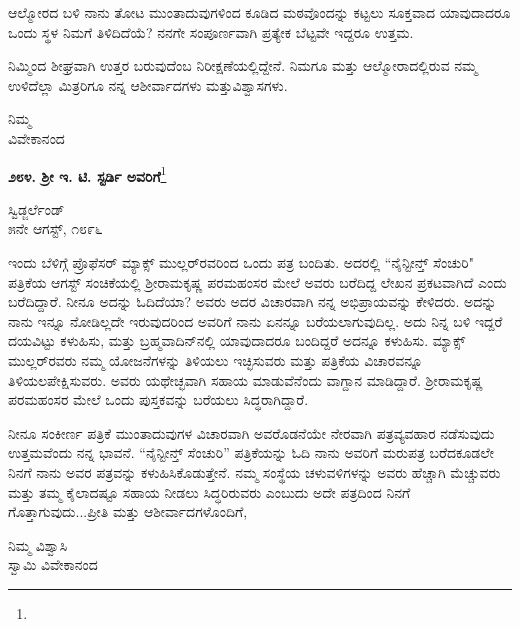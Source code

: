 ಆಲ್ಮೋರದ ಬಳಿ ನಾನು ತೋಟ ಮುಂತಾದುವುಗಳಿಂದ ಕೂಡಿದ ಮಠವೊಂದನ್ನು ಕಟ್ಟಲು ಸೂಕ್ತವಾದ ಯಾವುದಾದರೂ ಒಂದು ಸ್ಥಳ ನಿಮಗೆ ತಿಳಿದಿದೆಯೆ? ನನಗೇ ಸಂಪೂರ್ಣವಾಗಿ ಪ್ರತ್ಯೇಕ ಬೆಟ್ಟವೇ ಇದ್ದರೂ ಉತ್ತಮ.

ನಿಮ್ಮಿಂದ ಶೀಘ್ರವಾಗಿ ಉತ್ತರ ಬರುವುದೆಂಬ ನಿರೀಕ್ಷಣೆಯಲ್ಲಿದ್ದೇನೆ. ನಿಮಗೂ ಮತ್ತು ಆಲ್ಮೋರಾದಲ್ಲಿರುವ ನಮ್ಮ ಉಳಿದೆಲ್ಲಾ ಮಿತ್ರರಿಗೂ ನನ್ನ ಆಶೀರ್ವಾದಗಳು ಮತ್ತು\break ವಿಶ್ವಾಸಗಳು.

\vspace{-0.65cm}

{\flushright
ನಿಮ್ಮ\\ವಿವೇಕಾನಂದ\par}

\begin{center}
\textbf{೨೮೪. ಶ‍್ರೀ ಇ. ಟಿ. ಸ್ಟರ್ಡಿ ಅವರಿಗೆ}\footnote{}
\end{center}

\vspace{-0.75cm}

\begin{flushright}
ಸ್ವಿಡ್ಜರ್ಲೆಂಡ್\\೫ನೇ ಆಗಸ್ಟ್, ೧೮೯೬
\end{flushright}

ಇಂದು ಬೆಳಿಗ್ಗೆ ಪ್ರೊಫೆಸರ್ ಮ್ಯಾಕ್ಸ್ ಮುಲ್ಲರ್‌ರವರಿಂದ ಒಂದು ಪತ್ರ ಬಂದಿತು. ಅದರಲ್ಲಿ ``ನೈನ್ಟೀನ್ತ್ ಸೆಂಚುರಿ" ಪತ್ರಿಕೆಯ ಆಗಸ್ಟ್ ಸಂಚಿಕೆಯಲ್ಲಿ ಶ‍್ರೀರಾಮಕೃಷ್ಣ ಪರಮಹಂಸರ ಮೇಲೆ ಅವರು ಬರೆದಿದ್ದ ಲೇಖನ ಪ್ರಕಟವಾಗಿದೆ ಎಂದು ಬರೆದಿದ್ದಾರೆ. ನೀನೂ ಅದನ್ನು ಓದಿದೆಯಾ? ಅವರು ಅದರ ವಿಚಾರವಾಗಿ ನನ್ನ ಅಭಿಪ್ರಾಯವನ್ನು ಕೇಳಿದರು. ಅದನ್ನು ನಾನು ಇನ್ನೂ ನೋಡಿಲ್ಲದೇ ಇರುವುದರಿಂದ ಅವರಿಗೆ ನಾನು ಏನನ್ನೂ ಬರೆಯಲಾಗುವುದಿಲ್ಲ. ಅದು ನಿನ್ನ ಬಳಿ ಇದ್ದರೆ ದಯವಿಟ್ಟು ಕಳುಹಿಸು, ಮತ್ತು ಬ್ರಹ್ಮವಾದಿನ್‌ನಲ್ಲಿ ಯಾವುದಾದರೂ ಬಂದಿದ್ದರೆ ಅದನ್ನೂ ಕಳುಹಿಸು. ಮ್ಯಾಕ್ಸ್ ಮುಲ್ಲರ್‌ರವರು ನಮ್ಮ ಯೋಜನೆಗಳನ್ನು ತಿಳಿಯಲು ಇಚ್ಛಿಸುವರು ಮತ್ತು ಪತ್ರಿಕೆಯ ವಿಚಾರವನ್ನೂ ತಿಳಿಯಲಪೇಕ್ಷಿಸುವರು. ಅವರು ಯಥೇಚ್ಛವಾಗಿ ಸಹಾಯ ಮಾಡುವೆನೆಂದು ವಾಗ್ದಾನ ಮಾಡಿದ್ದಾರೆ. ಶ‍್ರೀರಾಮಕೃಷ್ಣ ಪರಮಹಂಸರ ಮೇಲೆ ಒಂದು ಪುಸ್ತಕವನ್ನು ಬರೆಯಲು ಸಿದ್ಧರಾಗಿದ್ದಾರೆ.

ನೀನೂ ಸಂಕೀರ್ಣ ಪತ್ರಿಕೆ ಮುಂತಾದುವುಗಳ ವಿಚಾರವಾಗಿ ಅವರೊಡನೆಯೇ ನೇರವಾಗಿ ಪತ್ರವ್ಯವಹಾರ ನಡೆಸುವುದು ಉತ್ತಮವೆಂದು ನನ್ನ ಭಾವನೆ. ``ನೈನ್ಟೀನ್ತ್ ಸೆಂಚುರಿ'' ಪತ್ರಿಕೆಯನ್ನು ಓದಿ ನಾನು ಅವರಿಗೆ ಮರುಪತ್ರ ಬರೆದಕೂಡಲೇ ನಿನಗೆ ನಾನು ಅವರ ಪತ್ರವನ್ನು ಕಳುಹಿಸಿಕೊಡುತ್ತೇನೆ. ನಮ್ಮ ಸಂಸ್ಥೆಯ ಚಳುವಳಿಗಳನ್ನು ಅವರು ಹೆಚ್ಚಾಗಿ ಮೆಚ್ಚುವರು ಮತ್ತು ತಮ್ಮ ಕೈಲಾದಷ್ಟೂ ಸಹಾಯ ನೀಡಲು ಸಿದ್ಧರಿರುವರು ಎಂಬುದು ಅದೇ ಪತ್ರದಿಂದ ನಿನಗೆ ಗೊತ್ತಾಗುವುದು...ಪ್ರೀತಿ ಮತ್ತು ಆಶೀರ್ವಾದಗಳೊಂದಿಗೆ,

\vspace{-0.4cm}

\begin{flushright}
ನಿಮ್ಮ ವಿಶ್ವಾಸಿ\\ಸ್ವಾಮಿ ವಿವೇಕಾನಂದ
\end{flushright}

